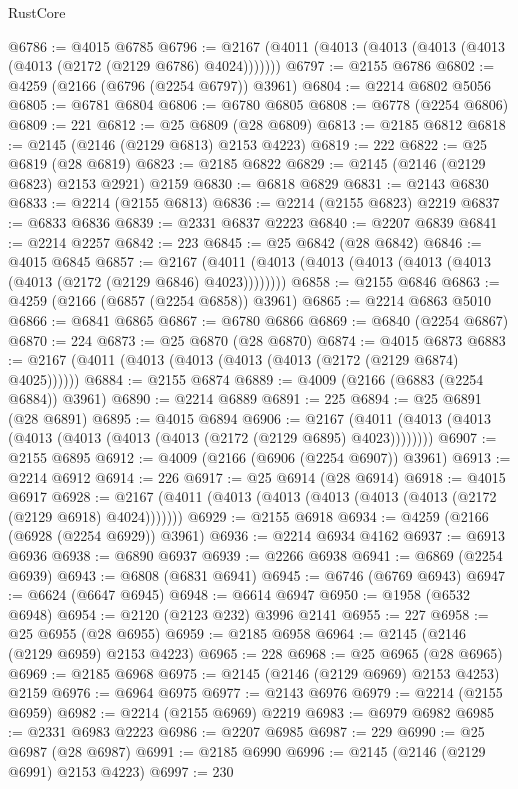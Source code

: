 \begin{lexlean}{RustCore}
\begin{coremodule}
@6786 := @4015 @6785
@6796 := @2167 (@4011 (@4013 (@4013 (@4013 (@4013 (@4013 (@2172 (@2129 @6786) @4024)))))))
@6797 := @2155 @6786
@6802 := @4259 (@2166 (@6796 (@2254 @6797)) @3961)
@6804 := @2214 @6802 @5056
@6805 := @6781 @6804
@6806 := @6780 @6805
@6808 := @6778 (@2254 @6806)
@6809 := 221
@6812 := @25 @6809 (@28 @6809)
@6813 := @2185 @6812
@6818 := @2145 (@2146 (@2129 @6813) @2153 @4223)
@6819 := 222
@6822 := @25 @6819 (@28 @6819)
@6823 := @2185 @6822
@6829 := @2145 (@2146 (@2129 @6823) @2153 @2921) @2159
@6830 := @6818 @6829
@6831 := @2143 @6830
@6833 := @2214 (@2155 @6813)
@6836 := @2214 (@2155 @6823) @2219
@6837 := @6833 @6836
@6839 := @2331 @6837 @2223
@6840 := @2207 @6839
@6841 := @2214 @2257
@6842 := 223
@6845 := @25 @6842 (@28 @6842)
@6846 := @4015 @6845
@6857 := @2167 (@4011 (@4013 (@4013 (@4013 (@4013 (@4013 (@4013 (@2172 (@2129 @6846) @4023))))))))
@6858 := @2155 @6846
@6863 := @4259 (@2166 (@6857 (@2254 @6858)) @3961)
@6865 := @2214 @6863 @5010
@6866 := @6841 @6865
@6867 := @6780 @6866
@6869 := @6840 (@2254 @6867)
@6870 := 224
@6873 := @25 @6870 (@28 @6870)
@6874 := @4015 @6873
@6883 := @2167 (@4011 (@4013 (@4013 (@4013 (@4013 (@2172 (@2129 @6874) @4025))))))
@6884 := @2155 @6874
@6889 := @4009 (@2166 (@6883 (@2254 @6884)) @3961)
@6890 := @2214 @6889
@6891 := 225
@6894 := @25 @6891 (@28 @6891)
@6895 := @4015 @6894
@6906 := @2167 (@4011 (@4013 (@4013 (@4013 (@4013 (@4013 (@4013 (@2172 (@2129 @6895) @4023))))))))
@6907 := @2155 @6895
@6912 := @4009 (@2166 (@6906 (@2254 @6907)) @3961)
@6913 := @2214 @6912
@6914 := 226
@6917 := @25 @6914 (@28 @6914)
@6918 := @4015 @6917
@6928 := @2167 (@4011 (@4013 (@4013 (@4013 (@4013 (@4013 (@2172 (@2129 @6918) @4024)))))))
@6929 := @2155 @6918
@6934 := @4259 (@2166 (@6928 (@2254 @6929)) @3961)
@6936 := @2214 @6934 @4162
@6937 := @6913 @6936
@6938 := @6890 @6937
@6939 := @2266 @6938
@6941 := @6869 (@2254 @6939)
@6943 := @6808 (@6831 @6941)
@6945 := @6746 (@6769 @6943)
@6947 := @6624 (@6647 @6945)
@6948 := @6614 @6947
@6950 := @1958 (@6532 @6948)
@6954 := @2120 (@2123 @232) @3996 @2141
@6955 := 227
@6958 := @25 @6955 (@28 @6955)
@6959 := @2185 @6958
@6964 := @2145 (@2146 (@2129 @6959) @2153 @4223)
@6965 := 228
@6968 := @25 @6965 (@28 @6965)
@6969 := @2185 @6968
@6975 := @2145 (@2146 (@2129 @6969) @2153 @4253) @2159
@6976 := @6964 @6975
@6977 := @2143 @6976
@6979 := @2214 (@2155 @6959)
@6982 := @2214 (@2155 @6969) @2219
@6983 := @6979 @6982
@6985 := @2331 @6983 @2223
@6986 := @2207 @6985
@6987 := 229
@6990 := @25 @6987 (@28 @6987)
@6991 := @2185 @6990
@6996 := @2145 (@2146 (@2129 @6991) @2153 @4223)
@6997 := 230

\end{coremodule}
\end{lexlean}
